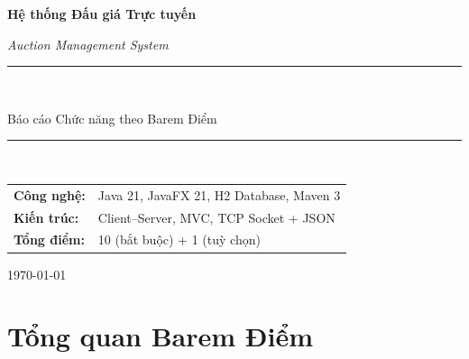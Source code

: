 \documentclass[12pt,a4paper]{article}
\begin{document}
\begin{titlepage}
  \centering
  \vspace*{2cm}
  {\Huge\bfseries Hệ thống Đấu giá Trực tuyến\par}
  \vspace{0.5cm}
  {\large\itshape Auction Management System\par}
  \vspace{1.5cm}
  \rule{0.6\linewidth}{0.5pt}\\[0.4cm]
  {\large Báo cáo Chức năng theo Barem Điểm\par}
  \rule{0.6\linewidth}{0.5pt}\\[1.5cm]

  \begin{tabular}{ll}
    \textbf{Công nghệ:} & Java 21, JavaFX 21, H2 Database, Maven 3 \\[4pt]
    \textbf{Kiến trúc:} & Client–Server, MVC, TCP Socket + JSON \\[4pt]
    \textbf{Tổng điểm:} & 10 (bắt buộc) + 1 (tuỳ chọn) \\
  \end{tabular}

  \vfill
  {\small \today}
\end{titlepage}

\section*{Tổng quan Barem Điểm}
\end{document}
